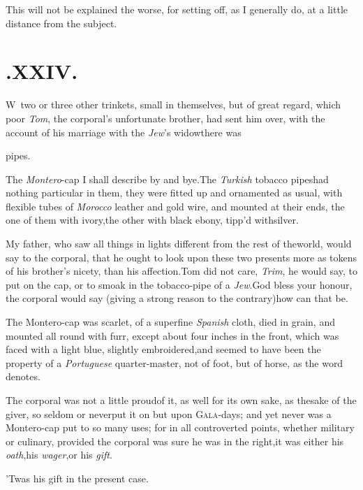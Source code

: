 \documentclass{article}
\begin{document}
This will not be explained the worse, for setting off, as I
generally do, at a little distance from the subject.

\newpage
\section{.\enspace XXIV.}

\lettrine{W}{\,} two or three other trinkets,
small in themselves, but of great regard, which poor \textit{Tom},
the corporal’s unfortunate brother, had sent him over, with
the account of his marriage with the \textit{Jew}’s
widow\tsh there was

\noindent
{}\break pipes.

The \textit{Montero}-cap I shall describe by and bye.\tsk The
\textit{Turkish} tobacco pipes\break had nothing particular in them, they
were fitted up and ornamented as usual, with flexible tubes of
\textit{Morocco} leather and gold wire, and mounted at their ends,
the one of them with ivory,\tsk the other with black ebony,
tipp’d with\break silver.

\newpage
My father, who saw all things in lights different from the rest
of the\break world, would say to the corporal, that he ought to look
upon these two presents more as tokens of his brother’s nicety,
than his affection.\tsh Tom did not care, \textit{Trim}, he
would say, to put on the cap, or to smoak in the tobacco-pipe of
a \textit{Jew}.\break\tsh God bless your honour, the corporal would
say (giving a strong reason to the contrary)\tsk how can that
be.\tsh

The Montero-cap was scarlet, of a superfine \textit{Spanish}
cloth, died in grain, and mounted all round with furr, except about
four inches in the front, which was faced with a light blue,
slightly embroidered,\tsk and seemed to have been the property of
a \textit{Portuguese} quarter-\pb master, not of foot, but of horse, as
the word denotes.

The corporal was not a little proud\break of it, as well for its own
sake, as the\break sake of the giver, so seldom or never\break put it on but
upon \textsc{Gala}-days; and yet never was a Montero-cap put
to so many uses; for in all controverted points, whether military
or culinary, provided the corporal was sure he was in the
right,\break\tsk it was either his \textit{oath},\tsk his
\textit{wager},\tsk\break or his \textit{gift}.

\tsh ’Twas his gift in the present case.
\end{document}
